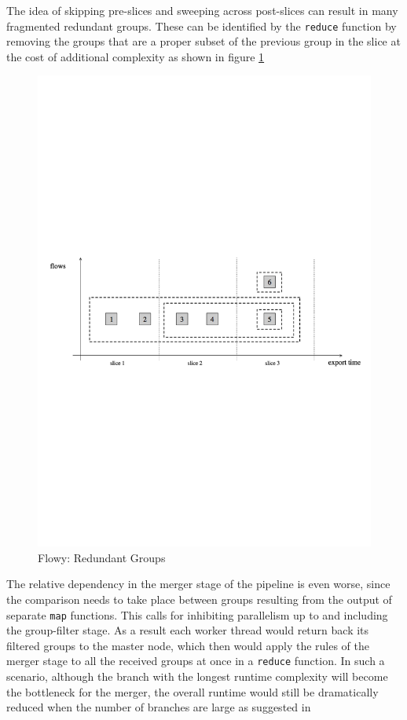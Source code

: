 The idea of skipping pre-slices and sweeping across post-slices can result in
many fragmented redundant groups. These can be identified by the
\texttt{reduce} function by removing the groups that are a proper subset of
the previous group in the slice at the cost of additional complexity as shown
in figure \ref{fig:flowy-redundant-groups}

\begin{figure}[h!]
\begin{center}
  \includegraphics* [width=0.7\linewidth]{figures/flowy-redundant-groups}
  \caption{Flowy: Redundant Groups \cite{pnemeth:thesis:2010}}
  \label{fig:flowy-redundant-groups}
\end{center}
\end{figure}

The relative dependency in the merger stage of the pipeline is even worse,
since the comparison needs to take place between groups resulting from the
output of separate \texttt{map} functions. This calls for inhibiting
parallelism up to and including the group-filter stage. As a result each
worker thread would return back its filtered groups to the master node, which
then  would apply the rules of the
merger stage to all the received groups at once in a \texttt{reduce} function.
In such a scenario, although the branch with the longest runtime complexity
will become the bottleneck for the merger, the overall runtime would still be
dramatically reduced when the number of branches are large as suggested in
\cite{jschauer:2012}


